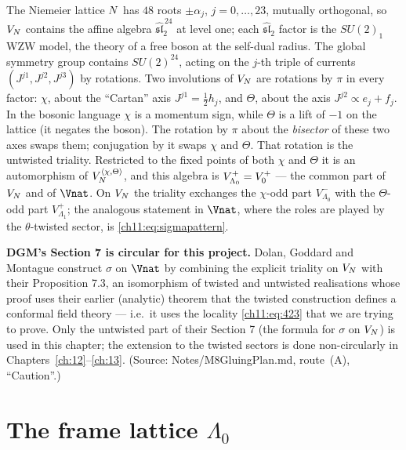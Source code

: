 The Niemeier lattice $N$ has $48$ roots $\pm\alpha_j$, $j=0,\dots,23$, mutually orthogonal, so
$V_N$ contains the affine algebra $\widehat{\mathfrak{sl}}_2^{\,24}$ at level one; each
$\widehat{\mathfrak{sl}}_2$ factor is the $SU(2)_1$ WZW model, the theory of a free boson at the
self-dual radius.  The global symmetry group contains $SU(2)^{24}$, acting on the $j$-th triple of
currents $(J^{j1},J^{j2},J^{j3})$ by rotations.  Two involutions of $V_N$ are rotations by
$\pi$ in every factor: $\chi$, about the ``Cartan'' axis $J^{j1}=\tfrac12 h_j$, and $\Theta$, about
the axis $J^{j2}\propto e_j+f_j$.  In the bosonic language $\chi$ is a momentum sign, while
$\Theta$ is a lift of $-1$ on the lattice (it negates the boson).  The rotation by $\pi$ about
the \emph{bisector} of these two axes swaps them; conjugation by it swaps $\chi$ and $\Theta$.
That rotation is the untwisted triality.  Restricted to the fixed points of both $\chi$ and
$\Theta$ it is an automorphism of $V_N^{\langle\chi,\Theta\rangle}$, and this algebra is
$V_{\Lambda_0}^+=V_0^{+}$ --- the common part of $V_N$ and of $\Vnat$.  On $V_N$ the
triality exchanges the $\chi$-odd part $V_{\Lambda_0}^-$ with the $\Theta$-odd part $V_{\Lambda_1}^+$;
the analogous statement in $\Vnat$, where the roles are played by the $\theta$-twisted sector,
is \eqref{ch11:eq:sigmapattern}.

\begin{warning}
\textbf{DGM's Section 7 is circular for this project.}  Dolan, Goddard and Montague construct $\sigma$
on $\Vnat$ by combining the explicit triality on $V_N$ with their Proposition 7.3, an
isomorphism of twisted and untwisted realisations whose proof uses their earlier (analytic) theorem
that the twisted construction defines a conformal field theory --- i.e.\ it uses the locality
\eqref{ch11:eq:423} that we are trying to prove.  Only the untwisted part of their Section 7 (the
formula for $\sigma$ on $V_N$) is used in this chapter; the extension to the twisted sectors
is done non-circularly in Chapters~\ref{ch:12}--\ref{ch:13}.  (Source: Notes/M8GluingPlan.md,
route~(A), ``Caution''.)
\end{warning}

\section{The frame lattice \texorpdfstring{$\Lambda_0$}{Lambda0}}\label{ch11:sec:frame}

